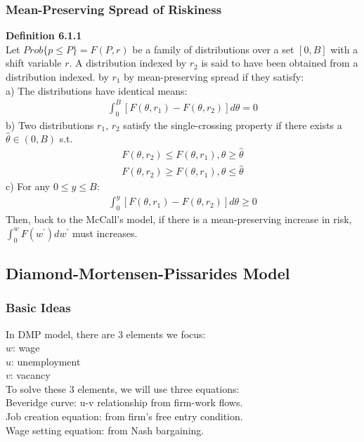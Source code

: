 \documentclass{article}
\begin{document}
\subsubsection{Mean-Preserving Spread of Riskiness}
\textbf{Definition 6.1.1}\\
Let $Prob\{p \leq P\} = F(P, r)$ be a family of distributions over a set $[0, B]$ with a shift variable $r$. A distribution indexed by $r_2$ is said to have been obtained from a distribution indexed. by $r_1$ by mean-preserving spread if they satisfy:\\
\indent a) The distributions have identical means:
\begin{align*}
	\int^B_0 [F(\theta, r_1) - F(\theta, r_2)]d\theta = 0
\end{align*}
\indent b) Two distributions $r_1$, $r_2$ satisfy the single-crossing property if there exists a $\hat{\theta} \in (0, B)$ s.t.
\begin{align*}
	F(\theta, r_2) \leq F(\theta, r_1), \theta \geq \hat{\theta}\\
	F(\theta, r_2) \geq F(\theta, r_1), \theta \leq \hat{\theta}
\end{align*}
\indent c) For any $0 \leq y \leq B$:
\begin{align*}
	\int^y_0 [F(\theta, r_1) - F(\theta, r_2)]d\theta \geq 0
\end{align*}
Then, back to the McCall's model, if there is a mean-preserving increase in risk, $\int^w_0 F(w^\prime)dw^\prime$ must increases.


\subsection{Diamond-Mortensen-Pissarides Model}
\subsubsection{Basic Ideas}
In DMP model, there are 3 elements we focus:\\
\indent $w$: wage\\
\indent $u$: unemployment\\
\indent $v$: vacancy\\
To solve these 3 elements, we will use three equations:\\
\indent Beveridge curve: u-v relationship from firm-work flows.\\
\indent Job creation equation: from firm's free entry condition.\\
\indent Wage setting equation: from Nash bargaining.
\end{document}
